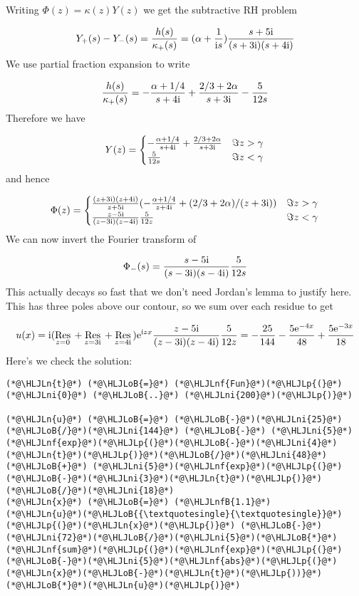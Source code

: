 \documentclass[12pt,landscape]{article}
\newcommand{\HLJLn}[1]{#1}
\newcommand{\HLJLnf}[1]{\textcolor[RGB]{66,102,213}{#1}}
\newcommand{\HLJLnfB}[1]{\textcolor[RGB]{59,151,46}{#1}}
\newcommand{\HLJLni}[1]{\textcolor[RGB]{59,151,46}{#1}}
\newcommand{\HLJLoB}[1]{\textcolor[RGB]{102,102,102}{\textbf{#1}}}
\newcommand{\HLJLp}[1]{#1}
\def\I{ {\rm i} }
\def\E{ {\rm e} }
\def\Res_#1{\underset{#1}{\rm Res}\,}
\begin{document}
{Writing $\Phi(z) = \kappa(z) Y(z)$ we get the subtractive RH problem

\[
Y_+(s) - Y_-(s) = {h(s) \over \kappa_+(s)} =  (\alpha + {1 \over \I s}) {s + 5 \I \over (s + 3 \I)(s + 4 \I)}
\]
We use partial fraction expansion to write

\[
{h(s) \over \kappa_+(s)} = -{\alpha + 1/4 \over s+4 \I} + {2/3 + 2 \alpha \over s+3 \I} - {5 \over 12 s}
\]
Therefore we have

\[
Y(z) = \begin{cases}
-{\alpha + 1/4 \over s+4 \I} + {2/3 + 2 \alpha \over s+3 \I} & \Im z > \gamma \\
        {5 \over 12 s} &\Im z < \gamma
\end{cases}
\]
and hence

\[
\Phi(z) =      \begin{cases}
{(z+3\I)(z+4\I) \over z+5\I} (-{\ensuremath{\alpha}+1/4 \over z+4\I} + (2/3 + 2\ensuremath{\alpha})/(z+3\I)) & \Im z > \gamma \\
        {z-5\I \over (z-3\I)(z-4\I)} {5 \over 12z}& \Im z < \gamma
        \end{cases}
\]
We can now invert the Fourier transform of

\[
\Phi_-(s) =         {s-5\I \over (s-3\I)(s-4\I)} {5 \over 12s}
\]
This actually decays so fast that we don't need Jordan's lemma to justify here. This has three poles above our contour, so we sum over each residue to get

\[
u(x) = \I (\Res_{z = 0} +\Res_{z = 3 \I } +\Res_{z = 4\I} )      \E^{\I z x }   {z-5\I \over (z-3\I)(z-4\I)} {5 \over 12z} =  -{25 \over 144} - {5 \E^{-4 x}  \over 48} + {5 \E^{-3 x} \over 18}
\]
Here's we check the solution:


\begin{lstlisting}
(*@\HLJLn{t}@*) (*@\HLJLoB{=}@*) (*@\HLJLnf{Fun}@*)(*@\HLJLp{(}@*)(*@\HLJLni{0}@*) (*@\HLJLoB{..}@*) (*@\HLJLni{200}@*)(*@\HLJLp{)}@*)

(*@\HLJLn{u}@*) (*@\HLJLoB{=}@*) (*@\HLJLoB{-}@*)(*@\HLJLni{25}@*)(*@\HLJLoB{/}@*)(*@\HLJLni{144}@*) (*@\HLJLoB{-}@*) (*@\HLJLni{5}@*)(*@\HLJLnf{exp}@*)(*@\HLJLp{(}@*)(*@\HLJLoB{-}@*)(*@\HLJLni{4}@*)(*@\HLJLn{t}@*)(*@\HLJLp{)}@*)(*@\HLJLoB{/}@*)(*@\HLJLni{48}@*) (*@\HLJLoB{+}@*) (*@\HLJLni{5}@*)(*@\HLJLnf{exp}@*)(*@\HLJLp{(}@*)(*@\HLJLoB{-}@*)(*@\HLJLni{3}@*)(*@\HLJLn{t}@*)(*@\HLJLp{)}@*)(*@\HLJLoB{/}@*)(*@\HLJLni{18}@*)
(*@\HLJLn{x}@*) (*@\HLJLoB{=}@*) (*@\HLJLnfB{1.1}@*)
(*@\HLJLn{u}@*)(*@\HLJLoB{{\textquotesingle}{\textquotesingle}}@*)(*@\HLJLp{(}@*)(*@\HLJLn{x}@*)(*@\HLJLp{)}@*) (*@\HLJLoB{-}@*) (*@\HLJLni{72}@*)(*@\HLJLoB{/}@*)(*@\HLJLni{5}@*)(*@\HLJLoB{*}@*)(*@\HLJLnf{sum}@*)(*@\HLJLp{(}@*)(*@\HLJLnf{exp}@*)(*@\HLJLp{(}@*)(*@\HLJLoB{-}@*)(*@\HLJLni{5}@*)(*@\HLJLnf{abs}@*)(*@\HLJLp{(}@*)(*@\HLJLn{x}@*)(*@\HLJLoB{-}@*)(*@\HLJLn{t}@*)(*@\HLJLp{))}@*)(*@\HLJLoB{*}@*)(*@\HLJLn{u}@*)(*@\HLJLp{)}@*)
\end{lstlisting}

}
\end{document}

